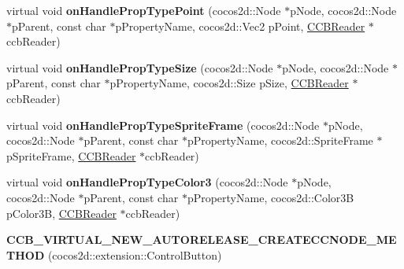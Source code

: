 \begin{DoxyCompactItemize}
\item 
\mbox{\label{classcocosbuilder_1_1ControlButtonLoader_aca92535deecc3300e43f96ee7851f45b}} 
virtual void {\bfseries on\+Handle\+Prop\+Type\+Point} (cocos2d\+::\+Node $\ast$p\+Node, cocos2d\+::\+Node $\ast$p\+Parent, const char $\ast$p\+Property\+Name, cocos2d\+::\+Vec2 p\+Point, \hyperlink{classcocosbuilder_1_1CCBReader}{C\+C\+B\+Reader} $\ast$ccb\+Reader)
\item 
\mbox{\label{classcocosbuilder_1_1ControlButtonLoader_a7184f3dcd5f2e73b587e4516ca771916}} 
virtual void {\bfseries on\+Handle\+Prop\+Type\+Size} (cocos2d\+::\+Node $\ast$p\+Node, cocos2d\+::\+Node $\ast$p\+Parent, const char $\ast$p\+Property\+Name, cocos2d\+::\+Size p\+Size, \hyperlink{classcocosbuilder_1_1CCBReader}{C\+C\+B\+Reader} $\ast$ccb\+Reader)
\item 
\mbox{\label{classcocosbuilder_1_1ControlButtonLoader_a3d7e8bd2e6474214c2178ad29a89fc82}} 
virtual void {\bfseries on\+Handle\+Prop\+Type\+Sprite\+Frame} (cocos2d\+::\+Node $\ast$p\+Node, cocos2d\+::\+Node $\ast$p\+Parent, const char $\ast$p\+Property\+Name, cocos2d\+::\+Sprite\+Frame $\ast$p\+Sprite\+Frame, \hyperlink{classcocosbuilder_1_1CCBReader}{C\+C\+B\+Reader} $\ast$ccb\+Reader)
\item 
\mbox{\label{classcocosbuilder_1_1ControlButtonLoader_abdc03fc42c26b38d1c921c1b3a77af56}} 
virtual void {\bfseries on\+Handle\+Prop\+Type\+Color3} (cocos2d\+::\+Node $\ast$p\+Node, cocos2d\+::\+Node $\ast$p\+Parent, const char $\ast$p\+Property\+Name, cocos2d\+::\+Color3B p\+Color3B, \hyperlink{classcocosbuilder_1_1CCBReader}{C\+C\+B\+Reader} $\ast$ccb\+Reader)
\item 
\mbox{\label{classcocosbuilder_1_1ControlButtonLoader_ae3108b6ff2f642b9e316fd07dd26a712}} 
{\bfseries C\+C\+B\+\_\+\+V\+I\+R\+T\+U\+A\+L\+\_\+\+N\+E\+W\+\_\+\+A\+U\+T\+O\+R\+E\+L\+E\+A\+S\+E\+\_\+\+C\+R\+E\+A\+T\+E\+C\+C\+N\+O\+D\+E\+\_\+\+M\+E\+T\+H\+OD} (cocos2d\+::extension\+::\+Control\+Button)
\item 
\mbox{\label{classcocosbuilder_1_1ControlButtonLoader_a426bffaac2d7e0f5646313144eab7b1a}} 

\end{DoxyCompactItemize}
